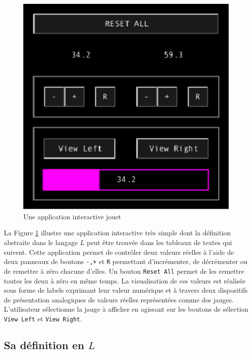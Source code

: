 \documentclass{ihm}
\begin{document}
\begin{figure}[t!] 
\begin{center}
\includegraphics [scale = 0.7]{appli}
\end{center}
\caption{Une application interactive jouet}
\label{fig:appli} 
\end{figure}

La Figure  \ref{fig:appli} illustre  une application  interactive très
simple  dont la  définition abstraite  dans le  langage $L$  peut être
trouvée dans  les tableaux de  textes qui suivent.   Cette application
permet de contrôler deux valeurs réelles  à l'aide de deux panneaux de
boutons  \texttt{-,+}  et   \texttt{R}  permettant  d'incrémenter,  de
décrémenter  ou  de  remettre  à  zéro  chacune  d'elles.   Un  bouton
\texttt{Reset All}  permet de les remettre  toutes les deux à  zéro en
même temps. La visualisation de ces valeurs est réalisée sous forme de
labels exprimant leur  valeur numérique et à  travers deux dispositifs
de présentation analogiques de  valeurs réelles représentées comme des
jauges.  L'utilisateur sélectionne la jauge à afficher en agissant sur
les boutons de sélection \texttt{View Left} et \texttt{View Right}.

\subsection{Sa définition en $L$}
\end{document}
